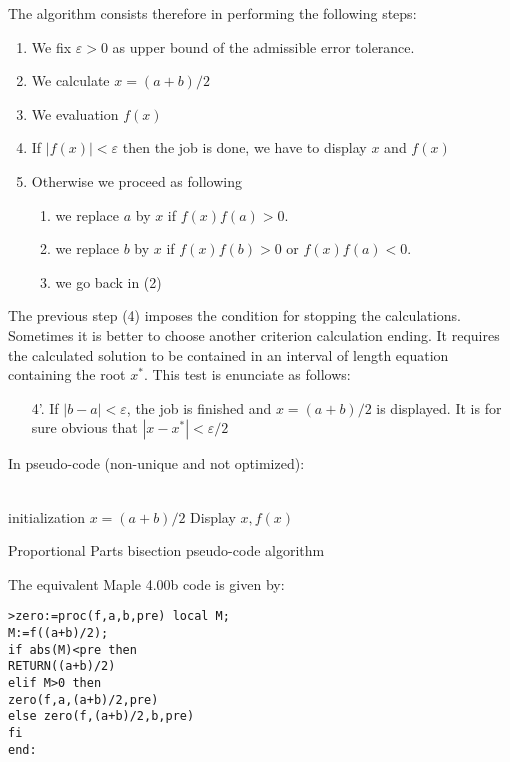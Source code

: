 	The algorithm consists therefore in performing the following steps:
	\begin{enumerate}
		\item We fix $\varepsilon>0$ as upper bound of the admissible error tolerance.
		
		\item We calculate $x=(a+b)/2$

		\item We evaluation $f(x)$
		
		\item If $|f(x)|<\varepsilon$ then the job is done, we have to display $x$ and $f(x)$
	
		\item Otherwise we proceed as following
			\begin{enumerate}
				\item we replace $a$ by $x$ if $f(x)f(a)>0$.
	
				\item we replace $b$ by $x$ if $f(x)f(b)>0$ or $f(x)f(a)<0$.
				
				\item we go back in (2)
			\end{enumerate}
	\end{enumerate}
	The previous step (4) imposes the condition for stopping the calculations. Sometimes it is better to choose another criterion calculation ending. It requires the calculated solution to be contained in an interval of length equation containing the root $x^{*}$. This test is enunciate as follows:
	\begin{enumerate}
		\item[4'.] If $|b-a|<\varepsilon$, the job is finished and $x=(a+b)/2$ is displayed. It is for sure obvious that $|x-x^{*}|<\varepsilon/2$
	\end{enumerate}
	In pseudo-code (non-unique and not optimized):\\\\
	\begin{algorithm}[H]
	 initialization\;
	$x=(a+b)/2$\;
	 Display $x,f(x)$\;
	 \caption{Proportional Parts bisection pseudo-code algorithm}
	\end{algorithm}
	The equivalent Maple 4.00b code is given by:
	
	\texttt{>zero:=proc(f,a,b,pre)
	local M;\\
	M:=f((a+b)/2);\\
	if abs(M)<pre then \\
	     RETURN((a+b)/2)\\
	elif M>0 then\\
	     zero(f,a,(a+b)/2,pre)\\
	else zero(f,(a+b)/2,b,pre)\\
	     fi\\
	end:}
	
